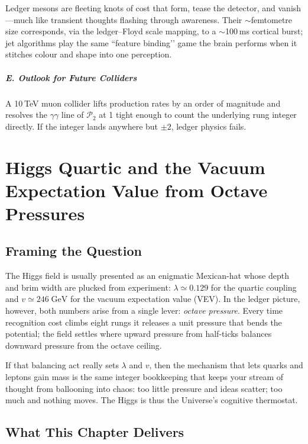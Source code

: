 \documentclass[11pt,oneside]{book}
\begin{document}
{Ledger mesons are fleeting knots of cost that form, tease the detector,
and vanish—much like transient thoughts flashing through awareness.
Their $\sim$femtometre size corresponds, via the ledger–Floyd scale
mapping, to a $\sim$100 ms cortical burst; jet algorithms play the same
“feature binding’’ game the brain performs when it stitches colour and
shape into one perception.

\paragraph*{E. Outlook for Future Colliders}

A 10 TeV muon collider lifts production rates by an order of magnitude
and resolves the $\gamma\gamma$ line of $\mathcal P_{2}$ at 1 %
tight enough to count the underlying rung integer directly.  
If the integer lands anywhere but $\pm2$, ledger physics fails.

\bigskip

\chapter{Higgs Quartic and the Vacuum Expectation Value from Octave Pressures}
\label{chap:higgs-octave}

\section*{Framing the Question}

The Higgs field is usually presented as an enigmatic Mexican-hat whose
depth and brim width are plucked from experiment:
$\lambda \simeq 0.129$ for the quartic coupling and
$v \simeq 246\;\mathrm{GeV}$ for the vacuum expectation value (VEV).
In the ledger picture, however, both numbers arise from a single lever:
\emph{octave pressure}.
Every time recognition cost climbs eight rungs it releases a unit
pressure that bends the potential; the field settles where upward
pressure from half-ticks balances downward pressure from the octave
ceiling.  

If that balancing act really sets $\lambda$ and $v$, then the mechanism
that lets quarks and leptons gain mass is the same integer bookkeeping
that keeps your stream of thought from ballooning into chaos: too little
pressure and ideas scatter; too much and nothing moves.  The Higgs is
thus the Universe’s cognitive thermostat.

\section*{What This Chapter Delivers}

}
\end{document}
